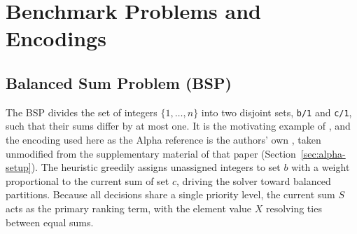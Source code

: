 \section{Benchmark Problems and Encodings}
\label{sec:benchmarks}

\subsection{Balanced Sum Problem (BSP)}
\label{sec:bsp}

The BSP divides the set of integers $\{1,\ldots,n\}$ into two disjoint sets, \texttt{b/1} and \texttt{c/1}, such that their sums differ by at most one. It is the motivating example of \cite{comploi2023dynamicAggregates}, and the encoding used here as the Alpha reference is the authors' own , taken unmodified from the supplementary material of that paper (Section~\ref{sec:alpha-setup}). The heuristic greedily assigns unassigned integers to set $b$ with a weight proportional to the current sum of set $c$, driving the solver toward balanced partitions. Because all decisions share a single priority level, the current sum $S$ acts as the primary ranking term, with the element value $X$ resolving ties between equal sums.

